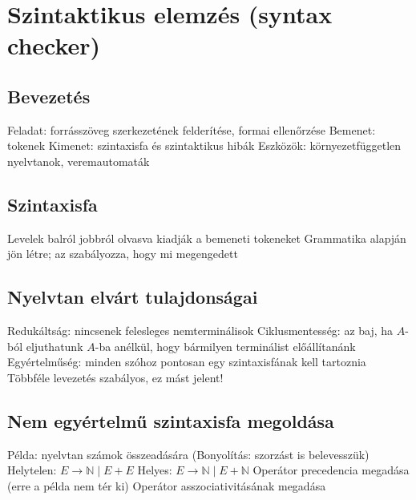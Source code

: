 \documentclass[12pt,a4paper]{article}
\begin{document}
\pagebreak

\section{Szintaktikus elemzés (syntax checker)}

\subsection{Bevezetés}

\begin{outline}
	\1 Feladat: forrásszöveg szerkezetének felderítése, formai ellenőrzése
	\1 Bemenet: tokenek
	\1 Kimenet: szintaxisfa és szintaktikus hibák
	\1 Eszközök: környezetfüggetlen nyelvtanok, veremautomaták
\end{outline}

\subsection{Szintaxisfa}

\begin{outline}
	\1 Levelek balról jobbról olvasva kiadják a bemeneti tokeneket
	\1 Grammatika alapján jön létre; az szabályozza, hogy mi megengedett
\end{outline}

\subsection{Nyelvtan elvárt tulajdonságai}

\begin{outline}
	\1 Redukáltság: nincsenek felesleges nemterminálisok
	\1 Ciklusmentesség: az baj, ha $A$-ból eljuthatunk $A$-ba anélkül, hogy bármilyen terminálist előállítanánk
	\1 Egyértelműség: minden szóhoz pontosan egy szintaxisfának kell tartoznia
		\2 Többféle levezetés szabályos, ez mást jelent!
\end{outline}

\subsection{Nem egyértelmű szintaxisfa megoldása}

\begin{outline}
	\1 Példa: nyelvtan számok összeadására (Bonyolítás: szorzást is belevesszük)
		\2 Helytelen: $E \to \mathbb{N} \;|\; E + E$
		\2 Helyes: $E \to \mathbb{N} \;|\; E + \mathbb{N}$
	\1 Operátor precedencia megadása (erre a példa nem tér ki)
	\1 Operátor asszociativitásának megadása
\end{outline}
\end{document}

